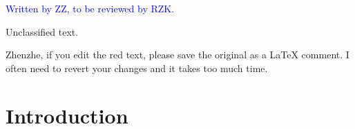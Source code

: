 \documentclass[%
 reprint,
 amsmath,amssymb,
 aps,
prb,
floatfix,
]{revtex4-2}
\begin{document}
\textcolor{blue}{Written by ZZ, to be reviewed by RZK.}

{Unclassified text.}

Zhenzhe, if you edit the red text, please save the original as a LaTeX comment. I often need to revert your changes and it takes too much time.

\fi

\section{Introduction}


\end{document}
